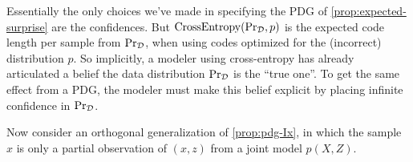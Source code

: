 \documentclass[twoside]{article}
\theoremstyle{plain}
\theoremstyle{definition}
\newcommand{\datadist}[1]{\Pr\nolimits_{#1}}
\begin{document}
Essentially the only choices we've made in specifying the PDG of \cref{prop:expected-surprise} are the confidences.
But
$\mathrm{CrossEntropy}(\datadist\xsamp,p)$
is the expected code length per sample
from $\datadist\xsamp$, when using codes optimized for the (incorrect) distribution $p$.
So implicitly, a modeler using cross-entropy has already articulated a belief the data distribution $\datadist\xsamp$ is the ``true one''.
To get the same effect from a PDG, the modeler must make this belief explicit by
placing infinite confidence in $\datadist\xsamp$.


Now consider an orthogonal generalization of \cref{prop:pdg-Ix}, in which the sample $x$ is only a partial observation of $(x,z)$ from a joint model $p(X,Z)$.
\end{document}
